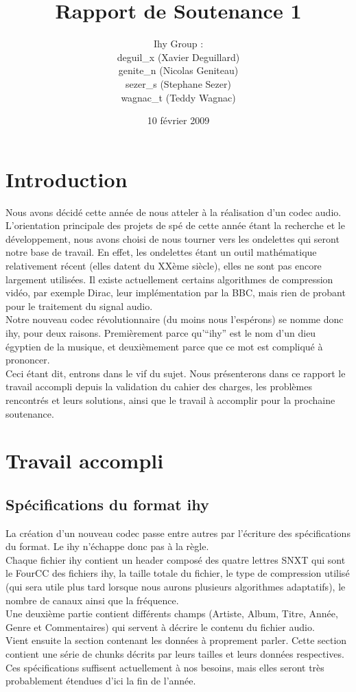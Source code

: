 \documentclass[a4paper,12pt]{article}
\title{Rapport de Soutenance 1}
\author{
Ihy Group : \\
deguil\_x (Xavier Deguillard)\\
genite\_n (Nicolas Geniteau)\\
sezer\_s (Stephane Sezer)\\
wagnac\_t (Teddy Wagnac)
}
\date{10 f\'evrier 2009}
\begin{document}
\maketitle

\newpage

\section*{Introduction}
Nous avons décidé cette année de nous atteler à la réalisation d'un codec audio.
L'orientation principale des projets de spé de cette année étant la recherche et
le développement, nous avons choisi de nous tourner vers les ondelettes qui
seront notre base de travail. En effet, les ondelettes étant un outil
mathématique relativement récent (elles datent du XXème siècle), elles ne sont
pas encore largement utilisées.  Il existe actuellement certains algorithmes de
compression vidéo, par exemple Dirac, leur implémentation par la BBC, mais rien
de probant pour le traitement du signal audio.\\
Notre nouveau codec révolutionnaire (du moins nous l'espérons) se nomme donc
ihy, pour deux raisons. Premièrement parce qu'``ihy'' est le nom d'un dieu
égyptien de la musique, et deuxièmement parce que ce mot est compliqué à
prononcer.\\
Ceci étant dit, entrons dans le vif du sujet. Nous présenterons dans ce rapport
le travail accompli depuis la validation du cahier des charges, les problèmes
rencontrés et leurs solutions, ainsi que le travail à accomplir pour la
prochaine soutenance.

\newpage

\tableofcontents

\newpage

\section{Travail accompli}

	\subsection{Spécifications du format ihy}
La création d'un nouveau codec passe entre autres par l'écriture des
spécifications du format. Le ihy n'échappe donc pas à la règle.\\
Chaque fichier
ihy contient un header composé des quatre lettres SNXT qui sont le FourCC
des fichiers ihy, la taille totale du fichier, le type de compression utilisé
(qui sera utile plus tard lorsque nous aurons plusieurs algorithmes adaptatifs),
le nombre de canaux ainsi que la fréquence.\\
Une deuxième partie contient
différents champs (Artiste, Album, Titre, Année, Genre et Commentaires) qui
servent à décrire le contenu du fichier audio.\\
Vient ensuite la section contenant les données à proprement parler. Cette
section contient une série de chunks décrits par leurs tailles et leurs données
respectives.\\
Ces spécifications suffisent actuellement à nos besoins, mais elles seront très
probablement étendues d'ici la fin de l'année.
\end{document}
